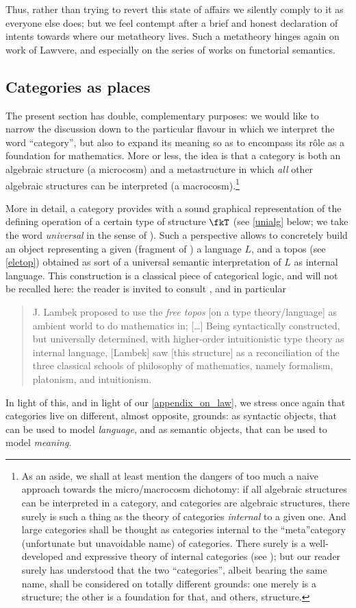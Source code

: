 Thus, rather than trying to revert this state of affairs we silently comply to it as everyone else does; but we feel contempt after a brief and honest declaration of intents towards where our metatheory lives. Such a metatheory hinges again on work of Lawvere, and especially on the series of works on functorial semantics.
\subsection{Categories as places}\label{as_places}
The present section has double, complementary purposes: we would like to narrow the discussion down to the particular flavour in which we interpret the word ``category'', but also to expand its meaning so as to encompass its r\^ole as a foundation for mathematics. More or less, the idea is that a category is both an algebraic structure (a microcosm) and a metastructure in which \emph{all} other algebraic structures can be interpreted (a macrocosm).\footnote{As an aside, we shall at least mention the dangers of too much a naive approach towards the micro/macrocosm dichotomy: if all algebraic structures can be interpreted in a category, and categories are algebraic structures, there surely is such a thing as the theory of categories \emph{internal} to a given one. And large categories shall be thought as categories internal to the ``meta''category (unfortunate but unavoidable name) of categories. There surely is a well-developed and expressive theory of internal categories (see \cite{internalcat,reference}); but our reader surely has understood that the two ``categories'', albeit bearing the same name, shall be considered on totally different grounds: one merely is a structure; the other is a foundation for that, and others, structure.}

More in detail, a category provides with a sound graphical representation of the defining operation of a certain type of structure $\fkT$ (see \autoref{unialg} below; we take the word \emph{universal} in the sense of \cite{Kurosh:o:altri}).
Such a perspective allows to concretely build an object representing a given (fragment of ) a language $L$, and a topos (see \autoref{eletop}) obtained as sort of a universal semantic interpretation of $L$ as internal language. This construction is a classical piece of categorical logic, and will not be recalled here: the reader is invited to consult \cite[II.12, 13, 14]{lambek1988introduction}, and in particular
\begin{quote}
	J. Lambek proposed to use the \emph{free topos} [on a type theory/language] as ambient world to do mathematics in; [\dots\unkern] Being syntactically constructed, but universally determined, with higher-order intuitionistic type theory as internal language, [Lambek] saw [this structure] as a reconciliation of the three classical schools of philosophy of mathematics, namely formalism, platonism, and intuitionism.
\end{quote}
In light of this, and in light of our \autoref{appendix_on_law}, we stress once again that categories live on different, almost opposite, grounds: as syntactic objects, that can be used to model \emph{language}, and as semantic objects, that can be used to model \emph{meaning}.

